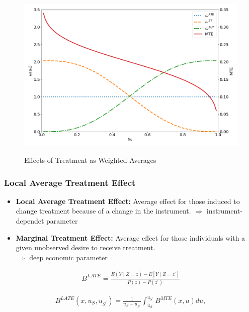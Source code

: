 \begin{frame}

\begin{figure}[htp]\centering
	\caption{Effects of Treatment as Weighted Averages}\label{Effects of Treatment as Weighted Averages}\scalebox{0.35}
	{\includegraphics{./material/fig-weights-marginal-effect.png}}
\end{figure}

\end{frame}

   
\begin{frame}
\frametitle{Local Average Treatment Effect}

\begin{itemize}
\item \textbf{Local Average Treatment Effect:} Average effect for those induced
to change treatment because of a change in the instrument.
\(\Rightarrow\) instrument-dependet parameter

\item \textbf{Marginal Treatment Effect:} Average effect for those individuals
with a given unobserved desire to receive treatment.\\
\(\Rightarrow\) deep economic parameter
\end{itemize}

    \begin{align*}
B^{LATE} = \frac{E(Y\mid Z = z) - E[Y \mid Z = z^\prime]}{P(z) - P(z^\prime)}
\end{align*}

\begin{align*}
B^{LATE}(x, u_S, u_{S^\prime}) = \frac{1}{u_S - u_{S^\prime}} \int_{u_S}^{u_{S^\prime}} B^{MTE}(x, u) du,
\end{align*}

\end{frame} 
 
